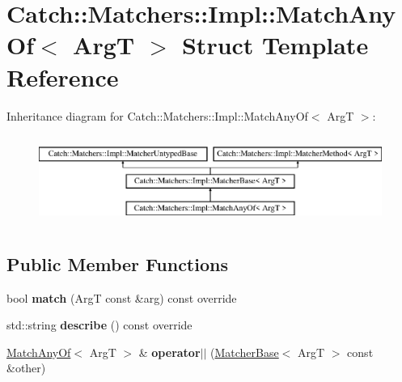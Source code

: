 \hypertarget{struct_catch_1_1_matchers_1_1_impl_1_1_match_any_of}{}\section{Catch\+:\+:Matchers\+:\+:Impl\+:\+:Match\+Any\+Of$<$ ArgT $>$ Struct Template Reference}
\label{struct_catch_1_1_matchers_1_1_impl_1_1_match_any_of}
Inheritance diagram for Catch\+:\+:Matchers\+:\+:Impl\+:\+:Match\+Any\+Of$<$ ArgT $>$\+:\begin{figure}[H]
\begin{center}
\leavevmode
\includegraphics[height=2.926829cm]{struct_catch_1_1_matchers_1_1_impl_1_1_match_any_of}
\end{center}
\end{figure}
\subsection*{Public Member Functions}
\begin{DoxyCompactItemize}
\item 
\mbox{\label{struct_catch_1_1_matchers_1_1_impl_1_1_match_any_of_a8a3e8338f979e56277dcf553efb78dc0}} 
bool {\bfseries match} (ArgT const \&arg) const override
\item 
\mbox{\label{struct_catch_1_1_matchers_1_1_impl_1_1_match_any_of_a315285204df93d1f8e72f50dd66eb709}} 
std\+::string {\bfseries describe} () const override
\item 
\mbox{\label{struct_catch_1_1_matchers_1_1_impl_1_1_match_any_of_a44d7582dbe09fc31b9a5ba8a6367b506}} 
\mbox{\hyperlink{struct_catch_1_1_matchers_1_1_impl_1_1_match_any_of}{Match\+Any\+Of}}$<$ ArgT $>$ \& {\bfseries operator$\vert$$\vert$} (\mbox{\hyperlink{struct_catch_1_1_matchers_1_1_impl_1_1_matcher_base}{Matcher\+Base}}$<$ ArgT $>$ const \&other)
\end{DoxyCompactItemize}
